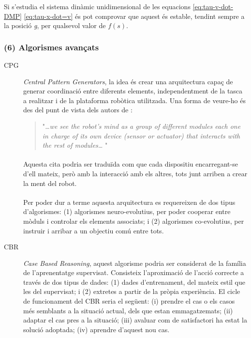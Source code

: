 \documentclass[12pt,a4paper,final,twoside]{article}
\begin{document}
Si s'estudia el sistema dinàmic unidimensional de les equacions \eqref{eq:tau-v-dot-DMP} \eqref{eq:tau-x-dot=v} és pot comprovar que aquest és estable, tendint sempre a la posició \textit{g}, per qualsevol valor de $f(s)$. 

\subsubsection*{(6) Algorismes avançats}

\begin{description}

\item[CPG] \textit{Central Pattern Generators}, la idea és crear una arquitectura capaç de generar coordinació entre diferents elements, independentment de la tasca a realitzar i de la plataforma robòtica utilitzada. Una forma de veure-ho és des del punt de vista dels autors de \cite{Tellez2005a}:
\begin{quotation}
"\textit{\dots we see the robot’s mind as a group of different modules each one in charge of its own device (sensor or actuator) that interacts with the rest of modules\dots} "
\end{quotation}

\paragraph{}Aquesta cita podria ser traduïda com que cada dispositiu encarregant-se d'ell mateix, però amb la interacció amb els altres, tots junt arriben a crear la ment del robot.

\paragraph{}Per poder dur a terme aquesta arquitectura es requereixen de dos tipus d'algorismes: (1) algorismes neuro-evolutius, per poder cooperar entre mòduls i controlar els elements associats; i (2) algorismes co-evolutius, per instruir i arribar a un objectiu comú entre tots.


\item[CBR] \textit{Case Based Reasoning}, aquest algorisme podria ser considerat de la família de l'aprenentatge supervisat. Consisteix l'aproximació de l'acció correcte a través de dos tipus de dades: (1) dades d'entrenament, del mateix estil que les del supervisat; i (2) extretes a partir de la pròpia experiència. El cicle de funcionament del CBR seria el següent: (i) prendre el cas o els casos més semblants a la situació actual, dels que estan emmagatzemats; (ii) adaptar el cas pres a la situació; (iii) avaluar com de satisfactori ha estat la solució adoptada; (iv) aprendre d'aquest nou cas.


\end{description}
\end{document}
